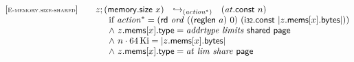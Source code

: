 $$
\begin{array}[t]{@{}lrcl@{}l@{}}
{[\textsc{\scriptsize E{-}memory.size{-}shared}]} \quad & z ; (\mathsf{memory{.}size}~x) & {\hookrightarrow}_{({{\mathit{action}}^\ast})} {} & ({\mathit{at}}{.}\mathsf{const}~n) &  \\
& \multicolumn{4}{@{}l@{}}{\quad
\quad
\begin{array}[t]{@{}l@{}}
\mbox{if}~ {{\mathit{action}}^\ast} = (\mathsf{rd}~{\mathit{ord}}~((\mathsf{reglen}~a)~0)~(\mathsf{i{\scriptstyle 32}}{.}\mathsf{const}~{|z{.}\mathsf{mems}{}[x]{.}\mathsf{bytes}|})) \\
{\land}~ z{.}\mathsf{mems}{}[x]{.}\mathsf{type} = {\mathit{addrtype}}~{\mathit{limits}}~\mathsf{shared}~\mathsf{page} \\
{\land}~ n \cdot 64 \, {\mathrm{Ki}} = {|z{.}\mathsf{mems}{}[x]{.}\mathsf{bytes}|} \\
{\land}~ z{.}\mathsf{mems}{}[x]{.}\mathsf{type} = {\mathit{at}}~{\mathit{lim}}~{\mathit{share}}~\mathsf{page} \\
\end{array}
} \\
\end{array}
$$

